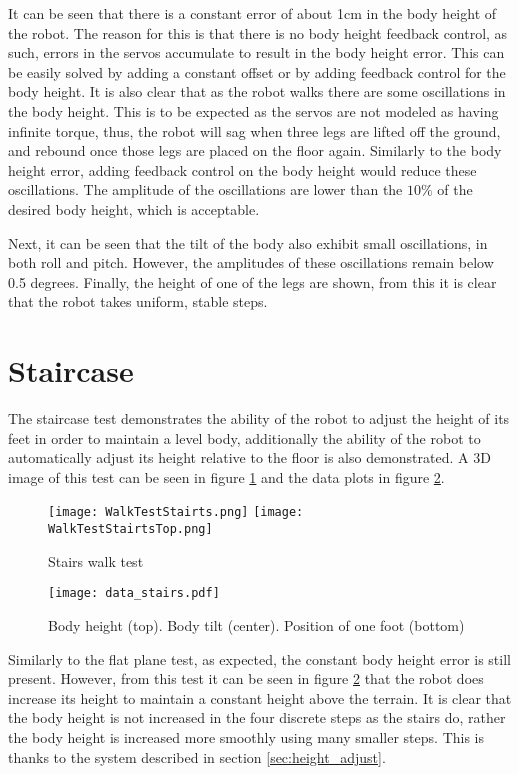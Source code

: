     It can be seen that there is a constant error of about 1cm in the body height of the robot. The reason for this is that there is no body height feedback control, as such, errors in the servos accumulate to result in the body height error. This can be easily solved by adding a constant offset or by adding feedback control for the body height. It is also clear that as the robot walks there are some oscillations in the body height. This is to be expected as the servos are not modeled as having infinite torque, thus, the robot will sag when three legs are lifted off the ground, and rebound once those legs are placed on the floor again. Similarly to the body height error, adding feedback control on the body height would reduce these oscillations. The amplitude of the oscillations are lower than the \(10\%\) of the desired body height, which is acceptable. 

    Next, it can be seen that the tilt of the body also exhibit small oscillations, in both roll and pitch. However, the amplitudes of these oscillations remain below 0.5 degrees. Finally, the height of one of the legs are shown, from this it is clear that the robot takes uniform, stable steps.

    \newpage
    \section{Staircase}
    The staircase test demonstrates the ability of the robot to adjust the height of its feet in order to maintain a level body,
    additionally the ability of the robot to automatically adjust its height relative to the floor is also demonstrated. A 3D image
    of this test can be seen in figure \ref{fig:stairs_test} and the data plots in figure \ref{fig:stairs_test_data}.
    \begin{figure}[h]
        \centering
        \texttt{[image: WalkTestStairts.png]}
        \texttt{[image: WalkTestStairtsTop.png]}
        \caption{Stairs walk test}
        \label{fig:stairs_test}
    \end{figure}
    \begin{figure}[h]
        \centering
        \texttt{[image: data\_stairs.pdf]}
        \caption{Body height (top). Body tilt (center). Position of one foot (bottom)}
        \label{fig:stairs_test_data}
    \end{figure}

    \noindent
    Similarly to the flat plane test, as expected, the constant body height error is still present.
    However, from this test it can be seen in figure \ref{fig:stairs_test_data} that the robot does increase its height to maintain a constant
    height above the terrain. It is clear that the body height is not increased in the four discrete steps as the stairs do, rather the
    body height is increased more smoothly using many smaller steps. This is thanks to the system described in section \ref{sec:height_adjust}.

